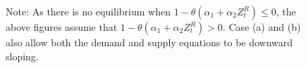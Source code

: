 \documentclass[11pt, a4paper]{article}
\begin{document}
\begin{figure}[!ht]
    \footnotesize
    Note: As there is no equilibrium when $1- \theta(\alpha_1 + \alpha_2 Z^{R}_{t}) \le 0$, the above figures assume that $1- \theta(\alpha_1 + \alpha_2 Z^{R}_{t}) > 0$. 
    Case (a) and (b) also allow both the demand and supply equations to be downward sloping.
\end{figure}







\newpage
\end{document}
